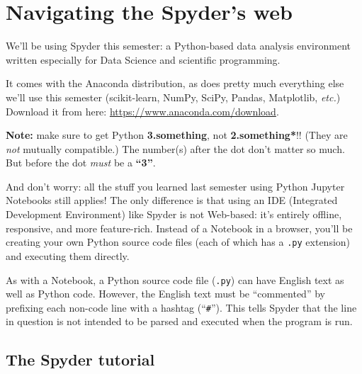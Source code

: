 
\chapter{Navigating the Spyder's web}




We'll be using Spyder this semester: a Python-based data analysis environment
written especially for Data Science and scientific programming.


It comes with the Anaconda distribution, as does pretty much everything else
we'll use this semester (scikit-learn, NumPy, SciPy, Pandas, Matplotlib,
\textit{etc.}) Download it from here: \url{https://www.anaconda.com/download}. 

\textbf{Note:} make sure to get Python \textbf{3.something}, not
\textbf{2.something*}!! (They are \textit{not} mutually compatible.) The
number(s) after the dot don't matter so much. But before the dot \textit{must}
be a \textbf{``3''}.


And don't worry: all the stuff you learned last semester using Python Jupyter
Notebooks still applies! The only difference is that using an IDE (Integrated
Development Environment) like Spyder is not Web-based: it's entirely offline,
responsive, and more feature-rich. Instead of a Notebook in a browser, you'll
be creating your own Python source code files (each of which has a \texttt{.py}
extension) and executing them directly.

As with a Notebook, a Python source code file (\texttt{.py}) can have English
text as well as Python code. However, the English text must be ``commented'' by
prefixing each non-code line with a hashtag (``\texttt{\#}''). This tells Spyder
that the line in question is not intended to be parsed and executed when the
program is run.


\section{The Spyder tutorial}

